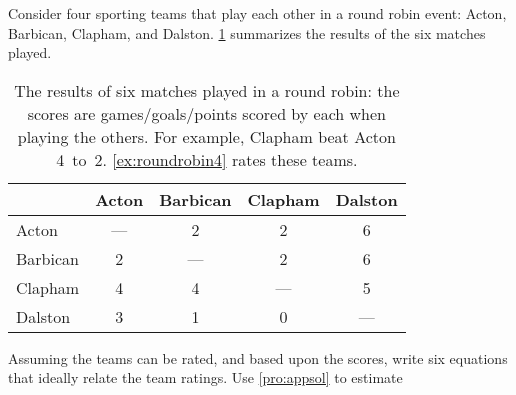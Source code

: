 \begin{exercise} \label{ex:roundrobin4} 
Consider four sporting teams that play each other in a round robin  event: Acton, Barbican, Clapham, and Dalston.
\cref{tbl:roundrobin4} summarizes the results of the six matches played.
\begin{table}
\caption{The results of six matches played in a round robin: the scores are games\slash goals\slash points scored by each when playing the others.  For example, Clapham beat Acton 4~to~2. \cref{ex:roundrobin4} rates these teams.}
\label{tbl:roundrobin4}
\begin{center}\smallskip
\begin{tabular}{l|cccc} \hline
&Acton& Barbican& Clapham& Dalston\\ \hline
Acton & --- & 2 & 2 & 6 \\
Barbican & 2 & --- & 2 & 6 \\
Clapham & 4 & 4 & --- & 5 \\
Dalston & 3 & 1 & 0 & --- \\ \hline
\end{tabular}
\end{center}
\end{table}%
Assuming the teams can be rated, and  based upon the scores, write six equations that ideally relate the team ratings.  
Use \cref{pro:appsol} to estimate 
\end{exercise}



